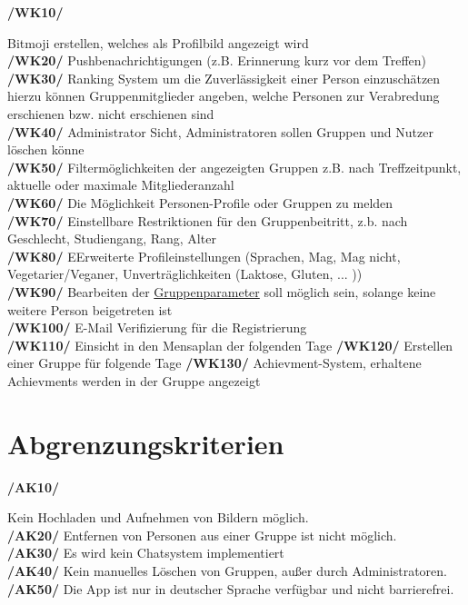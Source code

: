 \documentclass[a4paper]{scrreprt}
\begin{document}
\begin{addmargin}[25pt]{0pt} 
\hypertarget{wk10}{\textbf{/WK10/}} Bitmoji erstellen, welches als Profilbild angezeigt wird \\
\hypertarget{wk20}{\textbf{/WK20/}} Pushbenachrichtigungen (z.B. Erinnerung kurz vor dem Treffen) \\
\hypertarget{wk30}{\textbf{/WK30/}} Ranking System um die Zuverlässigkeit einer Person einzuschätzen \\ 
	hierzu können Gruppenmitglieder angeben, welche Personen zur Verabredung erschienen bzw. nicht erschienen sind\\
\hypertarget{wk40}{\textbf{/WK40/}} Administrator Sicht, Administratoren sollen Gruppen und Nutzer löschen könne\\
\hypertarget{wk50}{\textbf{/WK50/}} Filtermöglichkeiten der angezeigten Gruppen z.B. nach Treffzeitpunkt, aktuelle oder maximale Mitgliederanzahl \\
\hypertarget{wk60}{\textbf{/WK60/}} Die Möglichkeit Personen-Profile oder Gruppen zu melden\\
\hypertarget{wk70}{\textbf{/WK70/}} Einstellbare Restriktionen für den Gruppenbeitritt, z.b. nach Geschlecht, Studiengang, Rang, Alter \\
\hypertarget{wk80}{\textbf{/WK80/}} EErweiterte Profileinstellungen (Sprachen, Mag, Mag nicht, Vegetarier/Veganer, Unverträglichkeiten (Laktose, Gluten, ... ))\\
\hypertarget{wk90}{\textbf{/WK90/}} Bearbeiten der \hyperlink{label2}{Gruppenparameter} soll möglich sein, solange keine weitere Person beigetreten ist\\
\hypertarget{wk100}{\textbf{/WK100/}} E-Mail Verifizierung für die Registrierung\\
\hypertarget{wk110}{\textbf{/WK110/}} Einsicht in den Mensaplan der folgenden Tage
\hypertarget{wk120}{\textbf{/WK120/}} Erstellen einer Gruppe für folgende Tage
\hypertarget{wk130}{\textbf{/WK130/}} Achievment-System, erhaltene Achievments werden in der Gruppe angezeigt
\end{addmargin}
 
\section{Abgrenzungskriterien}

\begin{addmargin}[25pt]{0pt} 
\hypertarget{ak10}{\textbf{/AK10/}} Kein Hochladen und Aufnehmen von Bildern möglich.\\
\hypertarget{ak20}{\textbf{/AK20/}} Entfernen von Personen aus einer Gruppe ist nicht möglich.\\
\hypertarget{ak30}{\textbf{/AK30/}} Es wird kein Chatsystem implementiert\\
\hypertarget{ak40}{\textbf{/AK40/}} Kein manuelles Löschen von Gruppen, außer durch Administratoren.\\
\hypertarget{ak50}{\textbf{/AK50/}} Die App ist nur in deutscher Sprache verfügbar und nicht barrierefrei. \\
\end{addmargin}
\end{document}
